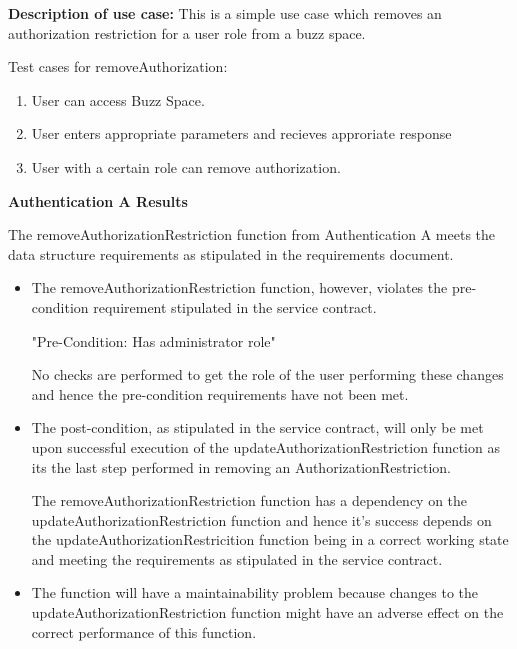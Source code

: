 \textbf{Description of use case:}\newline
This is a simple use case which removes an authorization restriction for a user role from a buzz space.

\medskip

\noindent
Test cases for removeAuthorization:
\begin{enumerate}
	\item User can access Buzz Space.
	\item User enters appropriate parameters and recieves approriate response
	\item User with a certain role can remove authorization.

\end{enumerate}

\noindent
\textbf{Authentication A Results} \newline

The removeAuthorizationRestriction function from Authentication A meets
the data structure requirements as stipulated in the requirements document.

\begin{itemize}
\item The removeAuthorizationRestriction function, however, violates the pre-condition
requirement stipulated in the service contract.

  "Pre-Condition: Has administrator role"

No checks are performed to get the role of the user performing these changes and hence
the pre-condition requirements have not been met.

\item The post-condition, as stipulated in the service contract, will only be met upon successful execution 
of the updateAuthorizationRestriction function as its the last step performed in removing an AuthorizationRestriction.

The removeAuthorizationRestriction function has a dependency on the updateAuthorizationRestriction function
and hence it's success depends on the updateAuthorizationRestricition function being in a correct working state and
meeting the requirements as stipulated in the service contract.

\item The function will have a maintainability problem because changes to the updateAuthorizationRestriction function 
might have an adverse effect on the correct performance of this function.
\end{itemize}
